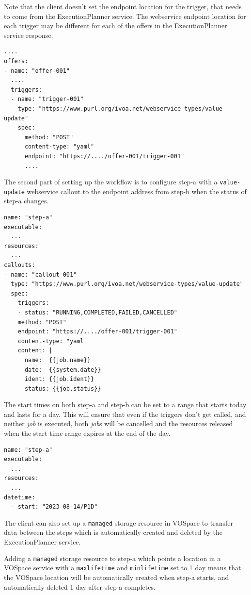 \documentclass[11pt,a4paper]{ivoa}
\newcommand{\webservice} {webservice}
\newcommand{\vospace} {VOSpace}
\newcommand{\execplanner} {ExecutionPlanner}
\newcommand{\codeword}[1] {\texttt{#1}}
\newcommand{\job} {\textit{job}}
\begin{document}
Note that the client doesn't set the endpoint location for the trigger, that needs to
come from the \execplanner{} service.
The \webservice{} endpoint location for each trigger may be different for each of the
offers in the \execplanner{} service response.

\begin{lstlisting}[]
....
offers:
- name: "offer-001"
  ....
  triggers:
  - name: "trigger-001"
    type: "https://www.purl.org/ivoa.net/webservice-types/value-update"
    spec:
      method: "POST"
      content-type: "yaml"
      endpoint: "https://..../offer-001/trigger-001"
      ....
\end{lstlisting}

The second part of setting up the workflow is to configure step-a with a
\codeword{value-update} \webservice{} callout to the endpoint address from
step-b when the status of step-a changes.

\begin{lstlisting}[]
name: "step-a"
executable:
  ...
resources:
  ...
callouts:
- name: "callout-001"
  type: "https://www.purl.org/ivoa.net/webservice-types/value-update"
  spec:
    triggers:
    - status: "RUNNING,COMPLETED,FAILED,CANCELLED"
    method: "POST"
    endpoint: "https://..../offer-001/trigger-001"
    content-type: "yaml
    content: |
      name:  {{job.name}}
      date:  {{system.date}}
      ident: {{job.ident}}
      status: {{job.status}}
\end{lstlisting}

The start times on both step-a and step-b can be set to a range that starts today and lasts for a day.
This will ensure that even if the triggers don't get called, and neither \job{} is executed, both \job{}s will
be cancelled and the resources released when the start time range expires at the end of the day.

\begin{lstlisting}[]
name: "step-a"
executable:
  ...
resources:
  ...
datetime:
  - start: "2023-08-14/P1D"
\end{lstlisting}

The client can also set up a \codeword{managed} storage resource in \vospace{} to transfer data
between the steps which is automatically created and deleted by the \execplanner{} service.

Adding a \codeword{managed} storage resource to step-a which points a location in a \vospace{} service
with a \codeword{maxlifetime} and \codeword{minlifetime} set to 1 day means that the \vospace{} location
will be automatically created when step-a starts, and automatically deleted 1 day after step-a completes.
\end{document}
